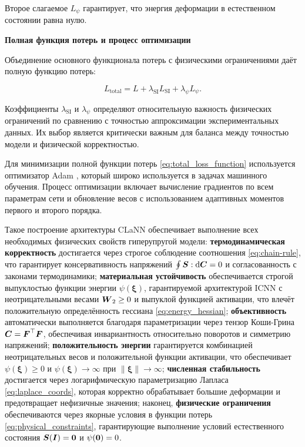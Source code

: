 Второе слагаемое $L_{\psi}$ гарантирует, что энергия деформации в естественном состоянии равна нулю.

\textbf{Полная функция потерь и процесс оптимизации}

Объединение основного функционала потерь с физическими ограничениями даёт полную функцию потерь:

\begin{equation}
 L_{\text{total}} = L + \lambda_{\text{SI}} L_{\text{SI}} + \lambda_{\psi} L_{\psi}.
\label{eq:total_loss_function}
\end{equation}

Коэффициенты $\lambda_{\text{SI}}$ и $\lambda_{\psi}$ определяют относительную важность физических ограничений 
по сравнению с точностью аппроксимации экспериментальных данных. 
Их выбор является критически важным для баланса между точностью модели и физической корректностью.

Для минимизации полной функции потерь \eqref{eq:total_loss_function} используется оптимизатор Adam \cite{kingma2014adam}, 
который широко используется в задачах машинного обучения. 
Процесс оптимизации включает вычисление градиентов по всем параметрам сети и обновление весов 
с использованием адаптивных моментов первого и второго порядка.

Такое построение архитектуры CLaNN обеспечивает выполнение всех необходимых физических свойств гиперупругой модели: 
\textbf{термодинамическая корректность} достигается через строгое соблюдение соотношения \eqref{eq:chain-rule}, 
что гарантирует консервативность напряжений $\oint \boldsymbol{S}:\mathrm{d}\boldsymbol{C} = 0$ и согласованность с законами 
термодинамики; \textbf{материальная устойчивость} обеспечивается строгой выпуклостью функции энергии 
$\psi(\boldsymbol{\xi})$, гарантируемой архитектурой ICNN с неотрицательными весами $\boldsymbol{W}_2 \geq 0$ и 
выпуклой функцией активации, что влечёт положительную определённость гессиана \eqref{eq:energy_hessian}; \textbf{объективность} автоматически выполняется благодаря параметризации через тензор 
Коши-Грина $\boldsymbol{C} = \boldsymbol{F}^{\top}\boldsymbol{F}$, обеспечивая инвариантность относительно поворотов и симметрию напряжений; 
\textbf{положительность энергии} гарантируется комбинацией неотрицательных весов и положительной функции активации, 
что обеспечивает $\psi(\boldsymbol{\xi}) \geq 0$ и $\psi(\boldsymbol{\xi}) \to \infty$ при $\|\boldsymbol{\xi}\| 
\to \infty$; \textbf{численная стабильность} достигается через логарифмическую параметризацию Лапласа \eqref{eq:laplace_coords}, которая корректно обрабатывает большие деформации и предотвращает нефизичные значения; наконец, \textbf{физические ограничения} обеспечиваются через якорные условия в функции потерь \eqref{eq:physical_constraints}, гарантирующие выполнение условий естественного состояния $\boldsymbol{S}(\boldsymbol{I}) = \boldsymbol{0}$ и $\psi(\boldsymbol{0}) = 0$.



